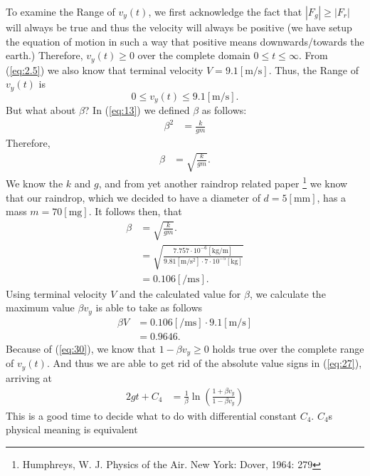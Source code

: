 \documentclass[paper=a4, fontsize=11pt]{scrartcl} %
\numberwithin{equation}{section} %
\numberwithin{figure}{section} %
\numberwithin{table}{section} %
\begin{document}
To examine the Range of $v_y(t)$,
we first acknowledge the fact that $|F_g| \geq |F_r|$ will always be true and thus the velocity will always be positive 
(we have setup the equation of motion in such a way that positive means downwards/towards the earth.) Therefore, $v_y(t) \geq 0$ over the 
complete domain $0 \leq t \leq \infty$. From (\ref{eq:2.5}) we also know that terminal velocity $V = 9.1[\si{\meter\per\second}]$.
Thus, the Range of $v_y(t)$ is 
\begin{equation} 
0 \leq v_y(t) \leq 9.1[\si{\meter\per\second}].
\end{equation}
But what about $\beta$? In (\ref{eq:13}) we defined $\beta$ as follows:
\begin{align} \label{eq:13.1}
\beta^2 &= \frac{k}{gm}
\end{align}
Therefore,
\begin{align} \label{eq:28}
\beta &= \sqrt{\frac{k}{gm}}.
\end{align}
We know the $k$ and $g$, and from yet another raindrop related paper
\footnote{Humphreys, W. J. Physics of the Air. New York: Dover, 1964: 279} we know that our raindrop, which we decided to have a diameter of
$d = 5 [\si{\milli\meter}]$, has a mass $m = 70 [\si{\milli\gram}]$.
It follows then, that
\begin{align} 
\beta &= \sqrt{\frac{k}{gm}}. \\
      &= \sqrt{\frac{7.757 \cdot 10^{-6}[\si{\kilogram\per\meter}]}{9.81 [\si{\meter\per\second\squared}] \cdot 7 \cdot 10^{-5} [\si{\kilo\gram}]}} \\
      &= 0.106 [\si{\per\meter\second}]. \label{eq:29}
\end{align}
Using terminal velocity $V$ and the calculated value for $\beta$, we calculate the maximum value $\beta v_y$ is able to take as follows 
\begin{align} 
\beta V &= 0.106 [\si{\per\meter\second}] \cdot 9.1[\si{\meter\per\second}] \\
        &= 0.9646 .\label{eq:30}
\end{align}
Because of (\ref{eq:30}), we know that $1 - \beta v_y \geq 0$ holds true over the complete range of $v_y(t)$. And thus we are able to
get rid of the absolute value signs in (\ref{eq:27}), arriving at
\begin{align} 
2g t + C_4 &=  \frac{1}{\beta} \ln{\left(\frac{1 + \beta v_y}{1 - \beta v_y} \right)} \label{eq:31}
\end{align}
This is a good time to decide what to do with differential constant $C_4$. $C_4$s physical meaning is equivalent 
\end{document}
